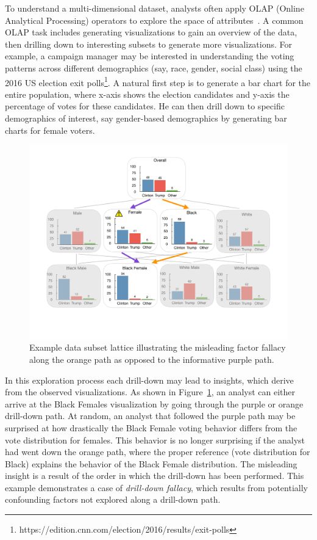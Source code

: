 To understand a multi-dimensional dataset, analysts often apply OLAP (Online Analytical Processing) operators to explore the space of attributes~\cite{Gray1997}. A common OLAP task includes generating visualizations to gain an overview of the data, then drilling down to interesting subsets to generate more visualizations. For example, a campaign manager may be interested in understanding the voting patterns across different demographics (say, race, gender, social class) using the 2016 US election exit polls\footnote{https://edition.cnn.com/election/2016/results/exit-polls}. A natural first step is to generate a bar chart for the entire population, where x-axis shows the election candidates and y-axis the percentage of votes for these candidates. He can then drill down to specific demographics of interest, say gender-based demographics by generating bar charts for female voters. %
\begin{figure}[h!]
\includegraphics[width=\linewidth]{figures/elections_example_lattice_teaser.pdf}
\caption{Example data subset lattice illustrating the misleading factor fallacy along the orange path as opposed to the informative purple path.}
\label{fig:elections_example}
\end{figure}
In this exploration process each drill-down may lead to insights, which derive from the observed visualizations. As shown in Figure~\ref{fig:elections_example}, an analyst can either arrive at the Black Females visualization by going through the purple or orange drill-down path. At random, an analyst that followed the purple path may be surprised at how drastically the Black Female voting behavior differs from the vote distribution for females. This behavior is no longer surprising if the analyst had went down the orange path, where the proper reference (vote distribution for Black) explains the behavior of the Black Female distribution. The misleading insight is a result of the order in which the drill-down has been performed. This example demonstrates a case of \emph{drill-down fallacy}, which results from potentially confounding factors not explored along a drill-down path.

